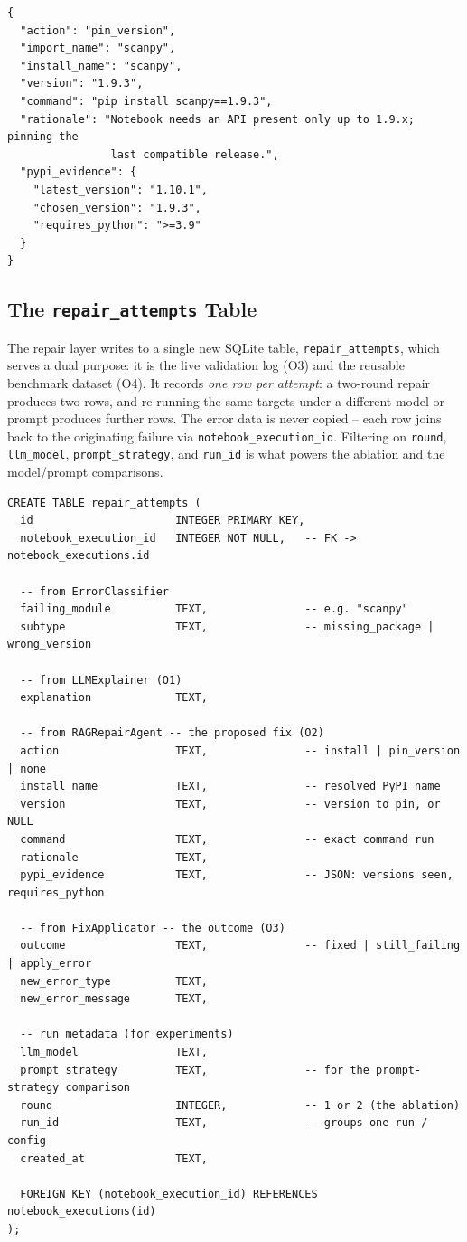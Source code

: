 \begin{verbatim}
{
  "action": "pin_version",
  "import_name": "scanpy",
  "install_name": "scanpy",
  "version": "1.9.3",
  "command": "pip install scanpy==1.9.3",
  "rationale": "Notebook needs an API present only up to 1.9.x; pinning the
                last compatible release.",
  "pypi_evidence": {
    "latest_version": "1.10.1",
    "chosen_version": "1.9.3",
    "requires_python": ">=3.9"
  }
}
\end{verbatim}

\subsection{The \texttt{repair\_attempts} Table}
\label{subsec:repair-table}

The repair layer writes to a single new SQLite table,
\texttt{repair\_attempts}, which serves a dual purpose: it is the live
validation log (O3) and the reusable benchmark dataset (O4). It records
\emph{one row per attempt}: a two-round repair produces two rows, and
re-running the same targets under a different model or prompt produces
further rows. The error data is never copied -- each row joins back to the
originating failure via \texttt{notebook\_execution\_id}. Filtering on
\texttt{round}, \texttt{llm\_model}, \texttt{prompt\_strategy}, and
\texttt{run\_id} is what powers the ablation and the model/prompt
comparisons.

\begin{verbatim}
CREATE TABLE repair_attempts (
  id                      INTEGER PRIMARY KEY,
  notebook_execution_id   INTEGER NOT NULL,   -- FK -> notebook_executions.id

  -- from ErrorClassifier
  failing_module          TEXT,               -- e.g. "scanpy"
  subtype                 TEXT,               -- missing_package | wrong_version

  -- from LLMExplainer (O1)
  explanation             TEXT,

  -- from RAGRepairAgent -- the proposed fix (O2)
  action                  TEXT,               -- install | pin_version | none
  install_name            TEXT,               -- resolved PyPI name
  version                 TEXT,               -- version to pin, or NULL
  command                 TEXT,               -- exact command run
  rationale               TEXT,
  pypi_evidence           TEXT,               -- JSON: versions seen, requires_python

  -- from FixApplicator -- the outcome (O3)
  outcome                 TEXT,               -- fixed | still_failing | apply_error
  new_error_type          TEXT,
  new_error_message       TEXT,

  -- run metadata (for experiments)
  llm_model               TEXT,
  prompt_strategy         TEXT,               -- for the prompt-strategy comparison
  round                   INTEGER,            -- 1 or 2 (the ablation)
  run_id                  TEXT,               -- groups one run / config
  created_at              TEXT,

  FOREIGN KEY (notebook_execution_id) REFERENCES notebook_executions(id)
);
\end{verbatim}

